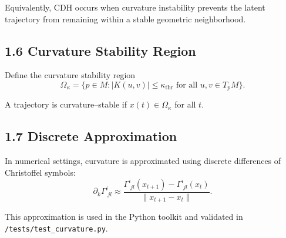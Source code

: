 Equivalently, CDH occurs when curvature instability prevents the latent
trajectory from remaining within a stable geometric neighborhood.

\subsection*{1.6 Curvature Stability Region}

Define the curvature stability region
\[
\Omega_{\kappa}
= \{ p \in M : |K(u,v)| \le \kappa_{\mathrm{thr}}
   \text{ for all } u,v \in T_p M \}.
\]

A trajectory is curvature–stable if $x(t) \in \Omega_{\kappa}$ for all $t$.

\subsection*{1.7 Discrete Approximation}

In numerical settings, curvature is approximated using discrete
differences of Christoffel symbols:
\[
\partial_k \Gamma^i_{\;jl}
\approx
\frac{\Gamma^i_{\;jl}(x_{t+1}) - \Gamma^i_{\;jl}(x_t)}
     {\|x_{t+1} - x_t\|}.
\]

This approximation is used in the Python toolkit and validated in
\texttt{/tests/test\_curvature.py}.

